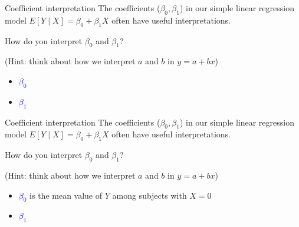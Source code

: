 \documentclass[10pt,t]{beamer}
\begin{document}
\begin{frame}{Coefficient interpretation}
The coefficients ($\beta_0, \beta_1$) in our simple linear regression model $E[Y \mid X] = \beta_0 + \beta_1 X$ often have useful interpretations.

\vspace{0.3cm} 

How do you interpret $\beta_0$ and $\beta_1$?

\vspace{0.3cm} 

\small (Hint: think about how we interpret $a$ and $b$ in $y = a + bx$)

\normalsize 
\vspace{0.3cm} 

\begin{itemize}
	\item \textcolor{blue}{$\beta_0$} 
	\item \textcolor{blue}{$\beta_1$} 
\end{itemize}

\end{frame}

\begin{frame}{Coefficient interpretation}
The coefficients ($\beta_0, \beta_1$) in our simple linear regression model $E[Y \mid X] = \beta_0 + \beta_1 X$ often have useful interpretations.

\vspace{0.3cm} 

How do you interpret $\beta_0$ and $\beta_1$?

\vspace{0.3cm} 

\small (Hint: think about how we interpret $a$ and $b$ in $y = a + bx$)
\normalsize 
\vspace{0.3cm} 

\begin{itemize}
	\item \textcolor{blue}{$\beta_0$} is the mean value of $Y$ among subjects with $X = 0$
	\item \textcolor{blue}{$\beta_1$} 
\end{itemize}

\end{frame}
\end{document}
